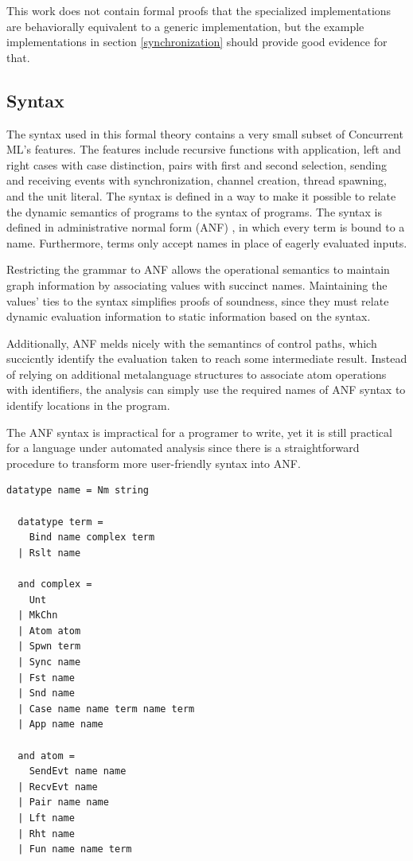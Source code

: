 \documentclass[letterpaper, 11pt]{extarticle}
\begin{document}
This work does not contain formal proofs that the specialized implementations are
behaviorally equivalent to a generic implementation, but the example implementations in 
section \ref{synchronization} should provide good evidence for that.

\subsection{Syntax}
The syntax used in this formal theory contains a very small subset of
Concurrent ML's features. The features include recursive functions with
application, left and right cases with case distinction, pairs with first
and second selection, sending and receiving events with synchronization,
channel creation, thread spawning, and the unit literal. The syntax is defined in a way to
make it possible to relate the dynamic semantics of programs to the syntax of programs.
The syntax is defined in administrative normal form (ANF) \cite{flanagan1993essence}, in which every term
is bound to a name. Furthermore, terms only accept names in place of eagerly evaluated
inputs. 

Restricting the grammar to ANF allows the operational semantics
to maintain graph information by associating values with succinct names.
Maintaining the values' ties to the syntax
simplifies proofs of soundness, since they must relate dynamic evaluation information
to static information based on the syntax.

Additionally, ANF melds nicely with the semantincs of control paths, which succicntly identify
the evaluation taken to reach some intermediate result.
Instead of relying on additional metalanguage structures to associate atom operations with identifiers,
the analysis can simply use the required names of ANF syntax to identify locations in the program.

The ANF syntax is impractical for a programer to write,
yet it is still practical for a language under automated analysis
since there is a straightforward procedure to transform
more user-friendly syntax into ANF.

\begin{lstlisting}[language=logic]
  datatype name = Nm string

  datatype term = 
    Bind name complex term 
  | Rslt name

  and complex = 
    Unt
  | MkChn
  | Atom atom
  | Spwn term 
  | Sync name
  | Fst name
  | Snd name
  | Case name name term name term 
  | App name name

  and atom = 
    SendEvt name name
  | RecvEvt name
  | Pair name name
  | Lft name
  | Rht name
  | Fun name name term 
\end{lstlisting}
\end{document}
